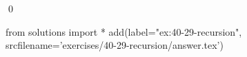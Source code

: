 
\begin{ex}
  \label{ex:40-29-recursion}
  
  \qed
\end{ex}
\begin{python0}
from solutions import *
add(label="ex:40-29-recursion",
    srcfilename='exercises/40-29-recursion/answer.tex')
\end{python0}
